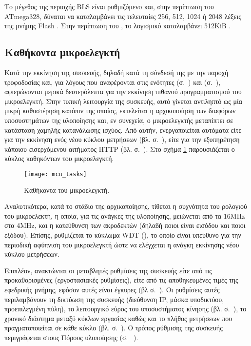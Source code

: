 Το μέγεθος της περιοχής BLS είναι ρυθμιζόμενο και, στην περίπτωση του ATmega328,
δύναται να καταλαμβάνει τις τελευταίες 256, 512, 1024 ή 2048 λέξεις της μνήμης
Flash \parencite[282]{atmel13}. Στην περίπτωση του ,
το λογισμικό  καταλαμβάνει 512KiB \parencite{arduino:uno}.


\subsection{Καθήκοντα μικροελεγκτή}

Κατά την εκκίνηση της συσκευής, δηλαδή κατά τη σύνδεσή της με την παροχή
τροφοδοσίας και, για λόγους που αναφέρονται στις ενότητες
 (σ.~\pageref{subsec:arduino}) και
 (σ.~\pageref{subsec:avr:progmem}), αφιερώνονται
μερικά δευτερόλεπτα για την εκκίνηση πιθανού προγραμματισμού του μικροελεγκτή.
Στην τυπική λειτουργία της συσκευής, αυτό γίνεται αντιληπτό ως μία μικρή
καθυστέρηση κατόπιν της οποίας, εκτελείται η αρχικοποίηση των διαφόρων
υποσυστημάτων της
υλοποίησης
και, εν συνεχεία, ο μικροελεγκτής μεταπίπτει σε κατάσταση χαμηλής κατανάλωσης
ισχύος. Από αυτήν, ενεργοποιείται αυτόματα είτε για την εκκίνηση ενός νέου
κύκλου μετρήσεων (βλ.  σ.~\pageref{sec:task}), είτε για την
εξυπηρέτηση κάποιου εισερχόμενου αιτήματος HTTP (βλ.  σ.~\pageref{sec:network:impl-resources}). Στο σχήμα
\ref{fig:mcu:tasks} παρουσιάζεται ο κύκλος καθηκόντων του μικροελεγκτή.

\begin{figure}
    \caption{Καθήκοντα του μικροελεγκτή.\label{fig:mcu:tasks}}
    \begin{center}
    \texttt{[image: mcu\_tasks]}
    \end{center}
\end{figure}

Αναλυτικότερα, κατά το στάδιο της αρχικοποίησης, τίθεται η συχνότητα του
ρολογιού του μικροελεκτή, η οποία, για τις ανάγκες της υλοποίησης, μειώνεται από
τα 16MHz στα 4MHz, και η κατεύθυνση των ακροδεκτών (δηλαδή ποιοι είναι εισόδου
και ποιοι εξόδου). Επίσης, ρυθμίζεται το κύκλωμα WDT (), το
οποίο είναι υπεύθυνο για την περιοδική αφύπνιση του μικροελεγκτή ώστε να
ελέγχεται η ανάγκη εκκίνησης νέου κύκλου μετρήσεων.

Επιπλέον, ανακτώνται οι μεταβλητές ρυθμίσεις της συσκευής είτε από τις
προκαθορισμένες (εργοστασιακές ρυθμίσεις), είτε από τις αποθηκευμένες τιμές της
εφεδρικής μνήμης, εφόσον αυτές είναι έγκυρες (βλ 
σ.~\pageref{subsec:backup-memory}).
Οι ρυθμίσεις αυτές περιλαμβάνουν τη δικτύωση της συσκευής (διεύθυνση IP, μάσκα
υποδικτύου, προεπιλεγμένη πύλη), το λειτουργικό εύρος του υποσυστήματος κίνησης
(βλ.  σ.~\pageref{sec:motor:coordinates}), το
χρονικό διάστημα μεταξύ κύκλων εργασίας καθώς και το πλήθος μετρήσεων που
πραγματοποιείται σε κάθε κύκλο (βλ.  σ.~\pageref{sec:task}).
Ο τρόπος ρύθμισης της συσκευής περιγράφεται στους Πόρους υλοποίησης (σ.~%
\pageref{sec:network:impl-resources}).

